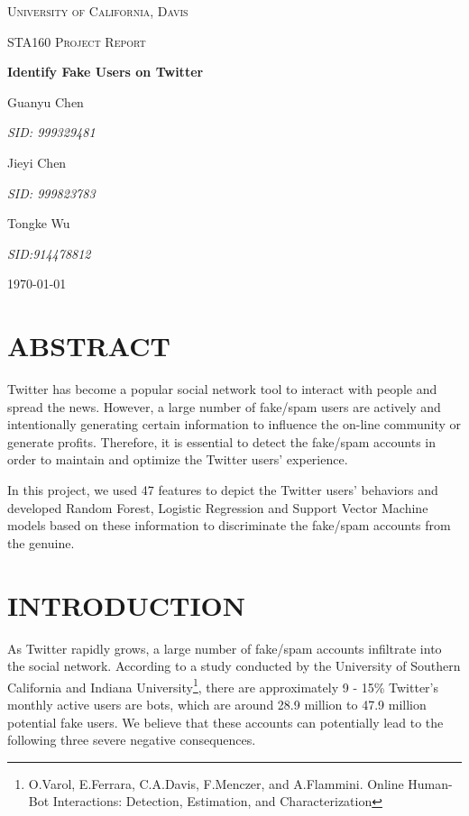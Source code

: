 \documentclass[a4paper, 12pt]{report}
\begin{document}
\begin{titlepage}
	\centering
	{\scshape\LARGE University of California, Davis \par}
	{\scshape\Large STA160 Project Report\par}
	\vspace{5cm}
	
	
	{\huge\bfseries Identify Fake Users on Twitter \par}
	\vspace{3cm}
	
	{\Large Guanyu Chen \par}
	{\large\itshape SID: 999329481 \par}
	
	{\Large Jieyi Chen \par}
	{\large\itshape SID: 999823783 \par}

	{\Large Tongke Wu\par}
	{\large\itshape SID:914478812 \par}
		\vfill
	{\large \today\par}
\end{titlepage}

\section*{ABSTRACT}
Twitter has become a popular social network tool to interact with people and spread the news. However, a large number of fake/spam users are actively and intentionally generating certain information to influence the on-line community or generate profits. Therefore, it is essential to detect the fake/spam accounts in order to maintain and optimize the Twitter users' experience. \par

\noindent In this project, we used 47 features to depict the Twitter users' behaviors and developed Random Forest, Logistic Regression and Support Vector Machine models based on these information to discriminate the fake/spam accounts from the genuine.
 
\section*{INTRODUCTION}
As Twitter rapidly grows, a large number of fake/spam accounts infiltrate into the social network. According to a study conducted by the University of Southern California and Indiana University\footnote{O.Varol, E.Ferrara, C.A.Davis, F.Menczer, and A.Flammini. Online Human-Bot Interactions: Detection, Estimation, and Characterization}, there are approximately 9 - 15\% Twitter's monthly active users are bots, which are around 28.9 million to 47.9 million potential fake users. We believe that these accounts can potentially lead to the following three severe negative consequences.
\end{document}
